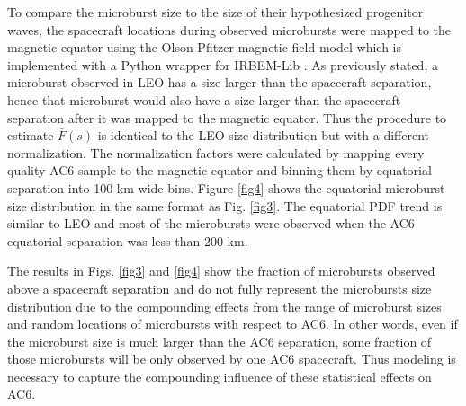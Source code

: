 \documentclass[draft]{agujournal2019}
\begin{document}
To compare the microburst size to the size of their hypothesized progenitor waves, the spacecraft locations during observed microbursts were mapped to the magnetic equator using the Olson-Pfitzer magnetic field model \cite{Olson1982} which is implemented with a Python wrapper for IRBEM-Lib \cite{irbem}. As previously stated, a microburst observed in LEO has a size larger than the spacecraft separation, hence that microburst would also have a size larger than the spacecraft separation after it was mapped to the magnetic equator. Thus the procedure to estimate $\bar{F}(s)$ is identical to the LEO size distribution but with a different normalization. The normalization factors were calculated by mapping every quality AC6 sample to the magnetic equator and binning them by equatorial separation into 100 km wide bins. Figure \ref{fig4} shows the equatorial microburst size distribution in the same format as Fig. \ref{fig3}. The equatorial PDF trend is similar to LEO and most of the microbursts were observed when the AC6 equatorial separation was less than 200 km.

The results in Figs. \ref{fig3} and \ref{fig4} show the fraction of microbursts observed above a spacecraft separation and do not fully represent the microbursts size distribution due to the compounding effects from the range of microburst sizes and random locations of microbursts with respect to AC6. In other words, even if the microburst size is much larger than the AC6 separation, some fraction of those microbursts will be only observed by one AC6 spacecraft. Thus modeling is necessary to capture the compounding influence of these statistical effects on AC6.
\end{document}

